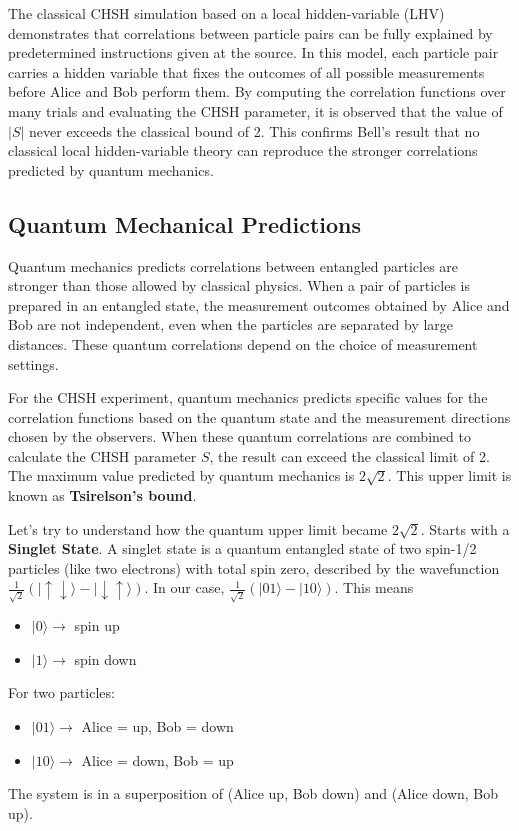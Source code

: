 \documentclass[14pt,a4paper]{extarticle}
\begin{document}
The classical CHSH simulation based on a local hidden-variable (LHV) demonstrates that correlations between particle pairs can be fully explained by predetermined instructions given at the source. In this model, each particle pair carries a hidden variable that fixes the outcomes of all possible measurements before Alice and Bob perform them. By computing the correlation functions over many trials and evaluating the CHSH parameter, it is observed that the value of $|S|$ never exceeds the classical bound of 2. This confirms Bell’s result that no classical local hidden-variable theory can reproduce the stronger correlations predicted by quantum mechanics.

\subsection{Quantum Mechanical Predictions}

Quantum mechanics predicts correlations between entangled particles are stronger than those allowed by classical physics. When a pair of particles is prepared in an entangled state, the measurement outcomes obtained by Alice and Bob are not independent, even when the particles are separated by large distances. These quantum correlations depend on the choice of measurement settings.

For the CHSH experiment, quantum mechanics predicts specific values for the correlation functions based on the quantum state and the measurement directions chosen by the observers. When these quantum correlations are combined to calculate the CHSH parameter $S$, the result can exceed the classical limit of 2. The maximum value predicted by quantum mechanics is $2\sqrt{2}$. This upper limit is known as \textbf{Tsirelson’s bound}.

Let's try to understand how the quantum upper limit became $2\sqrt{2}$. Starts with a \textbf{Singlet State}. A singlet state is a quantum entangled state of two spin-1/2 particles (like two electrons) with total spin zero, described by the wavefunction $\frac{1}{\sqrt{2}}\left(\lvert \uparrow \downarrow \rangle - \lvert \downarrow \uparrow \rangle\right)$. In our case, $\frac{1}{\sqrt{2}}\left(\lvert 01 \rangle - \lvert 10 \rangle\right)$. This means
\begin{itemize}
\item $\lvert 0 \rangle \rightarrow$ spin up
\item $\lvert 1 \rangle \rightarrow$ spin down
\end{itemize}
For two particles:
\begin{itemize}
\item $\lvert 01 \rangle \rightarrow$ Alice = up, Bob = down
\item $\lvert 10 \rangle \rightarrow$ Alice = down, Bob = up
\end{itemize}
The system is in a superposition of (Alice up, Bob down) and (Alice down, Bob up).
\end{document}
